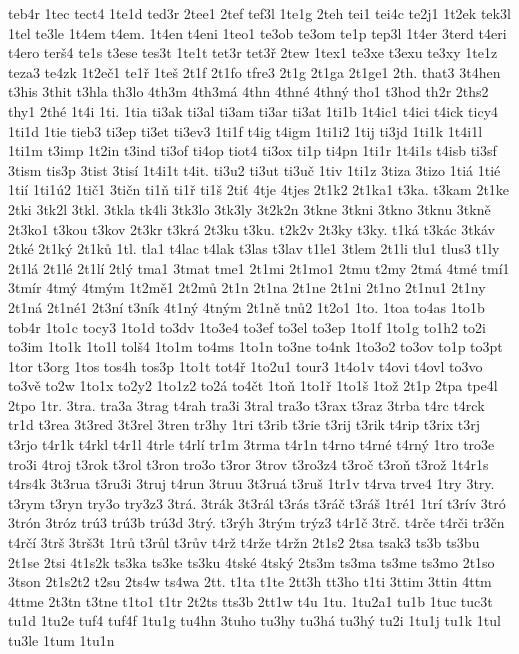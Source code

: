 teb4r
1tec
tect4
1te1d
ted3r
2tee1
2tef
tef3l
1te1g
2teh
tei1
tei4c
te2j1
1t2ek
tek3l
1tel
te3le
1t4em
t4em.
1t4en
t4eni
1teo1
te3ob
te3om
te1p
tep3l
1t4er
3terd
t4eri
t4ero
terš4
te1s
t3ese
tes3t
1te1t
tet3r
tet3ř
2tew
1tex1
te3xe
t3exu
te3xy
1te1z
teza3
te4zk
1t2eč1
te1ř
1teš
2t1f
2t1fo
tfre3
2t1g
2t1ga
2t1ge1
2th.
that3
3t4hen
t3his
3thit
t3hla
th3lo
4th3m
4th3má
4thn
4thné
4thný
tho1
t3hod
th2r
2ths2
thy1
2thé
1t4i
1ti.
1tia
ti3ak
ti3al
ti3am
ti3ar
ti3at
1ti1b
1t4ic1
t4ici
t4ick
ticy4
1ti1d
1tie
tieb3
ti3ep
ti3et
ti3ev3
1ti1f
t4ig
t4igm
1ti1i2
1tij
ti3jd
1ti1k
1t4i1l
1ti1m
t3imp
1t2in
t3ind
ti3of
ti4op
tiot4
ti3ox
ti1p
ti4pn
1ti1r
1t4i1s
t4isb
ti3sf
3tism
tis3p
3tist
3tisí
1t4i1t
t4it.
ti3u2
ti3ut
ti3uč
1tiv
1ti1z
3tiza
3tizo
1tiá
1tié
1tií
1ti1ú2
1tič1
3tičn
ti1ň
ti1ř
ti1š
2tiť
4tje
4tjes
2t1k2
2t1ka1
t3ka.
t3kam
2t1ke
2tki
3tk2l
3tkl.
3tkla
tk4li
3tk3lo
3tk3ly
3t2k2n
3tkne
3tkni
3tkno
3tknu
3tkně
2t3ko1
t3kou
t3kov
2t3kr
t3krá
2t3ku
t3ku.
t2k2v
2t3ky
t3ky.
t1ká
t3kác
3tkáv
2tké
2t1ký
2t1ků
1tl.
tla1
t4lac
t4lak
t3las
t3lav
t1le1
3tlem
2t1li
tlu1
tlus3
t1ly
2t1lá
2t1lé
2t1lí
2tlý
tma1
3tmat
tme1
2t1mi
2t1mo1
2tmu
t2my
2tmá
4tmé
tmí1
3tmír
4tmý
4tmým
1t2mě1
2t2mů
2t1n
2t1na
2t1ne
2t1ni
2t1no
2t1nu1
2t1ny
2t1ná
2t1né1
2t3ní
t3ník
4t1ný
4tným
2t1ně
tnů2
1t2o1
1to.
1toa
to4as
1to1b
tob4r
1to1c
tocy3
1to1d
to3dv
1to3e4
to3ef
to3el
to3ep
1to1f
1to1g
to1h2
to2i
to3im
1to1k
1to1l
tolš4
1to1m
to4ms
1to1n
to3ne
to4nk
1to3o2
to3ov
to1p
to3pt
1tor
t3org
1tos
tos4h
tos3p
1to1t
tot4ř
1to2u1
tour3
1t4o1v
t4ovi
t4ovl
to3vo
to3vě
to2w
1to1x
to2y2
1to1z2
to2á
to4čt
1toň
1to1ř
1to1š
1tož
2t1p
2tpa
tpe4l
2tpo
1tr.
3tra.
tra3a
3trag
t4rah
tra3i
3tral
tra3o
t3rax
t3raz
3trba
t4rc
t4rck
tr1d
t3rea
3t3red
3t3rel
3tren
tr3hy
1tri
t3rib
t3rie
t3rij
t3rik
t4rip
t3rix
t3rj
t3rjo
t4r1k
t4rkl
t4r1l
4trle
t4rlí
tr1m
3trma
t4r1n
t4rno
t4rné
t4rný
1tro
tro3e
tro3i
4troj
t3rok
t3rol
t3ron
tro3o
t3ror
3trov
t3ro3z4
t3roč
t3roň
t3rož
1t4r1s
t4rs4k
3t3rua
t3ru3i
3truj
t4run
3truu
3t3ruá
t3ruš
1tr1v
t4rva
trve4
1try
3try.
t3rym
t3ryn
try3o
try3z3
3trá.
3trák
3t3rál
t3rás
t3ráč
t3ráš
1tré1
1trí
t3rív
3tró
3trón
3tróz
trú3
trú3b
trú3d
3trý.
t3rýh
3trým
trýz3
t4r1č
3trč.
t4rče
t4rči
tr3čn
t4rčí
3trš
3trš3t
1trů
t3růl
t3rův
t4rž
t4rže
t4ržn
2t1s2
2tsa
tsak3
ts3b
ts3bu
2t1se
2tsi
4t1s2k
ts3ka
ts3ke
ts3ku
4tské
4tský
2ts3m
ts3ma
ts3me
ts3mo
2t1so
3tson
2t1s2t2
t2su
2ts4w
ts4wa
2tt.
t1ta
t1te
2tt3h
tt3ho
t1ti
3ttim
3ttin
4ttm
4ttme
2t3tn
t3tne
t1to1
t1tr
2t2ts
tts3b
2tt1w
t4u
1tu.
1tu2a1
tu1b
1tuc
tuc3t
tu1d
1tu2e
tuf4
tuf4f
1tu1g
tu4hn
3tuho
tu3hy
tu3há
tu3hý
tu2i
1tu1j
tu1k
1tul
tu3le
1tum
1tu1n
